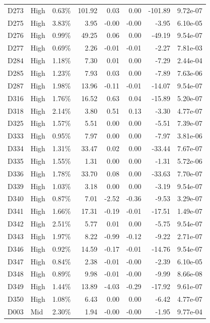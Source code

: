 \begin{tabular}{l l r r r r r r}
D273 & High & 0.63\% & 101.92 & 0.03 & 0.00 & -101.89 & 9.72e-07 \\
D275 & High & 3.83\% & 3.95 & -0.00 & -0.00 & -3.95 & 6.10e-05 \\
D276 & High & 0.99\% & 49.25 & 0.06 & 0.00 & -49.19 & 9.54e-07 \\
D277 & High & 0.69\% & 2.26 & -0.01 & -0.01 & -2.27 & 7.81e-03 \\
D284 & High & 1.18\% & 7.30 & 0.01 & 0.00 & -7.29 & 2.44e-04 \\
D285 & High & 1.23\% & 7.93 & 0.03 & 0.00 & -7.89 & 7.63e-06 \\
D287 & High & 1.98\% & 13.96 & -0.11 & -0.01 & -14.07 & 9.54e-07 \\
D316 & High & 1.76\% & 16.52 & 0.63 & 0.04 & -15.89 & 5.20e-07 \\
D318 & High & 2.14\% & 3.80 & 0.51 & 0.13 & -3.30 & 4.77e-07 \\
D325 & High & 1.57\% & 5.51 & 0.00 & 0.00 & -5.51 & 7.39e-07 \\
D333 & High & 0.95\% & 7.97 & 0.00 & 0.00 & -7.97 & 3.81e-06 \\
D334 & High & 1.31\% & 33.47 & 0.02 & 0.00 & -33.44 & 7.67e-07 \\
D335 & High & 1.55\% & 1.31 & 0.00 & 0.00 & -1.31 & 5.72e-06 \\
D336 & High & 1.78\% & 33.70 & 0.08 & 0.00 & -33.63 & 7.70e-07 \\
D339 & High & 1.03\% & 3.18 & 0.00 & 0.00 & -3.19 & 9.54e-07 \\
D340 & High & 0.87\% & 7.01 & -2.52 & -0.36 & -9.53 & 3.29e-07 \\
D341 & High & 1.66\% & 17.31 & -0.19 & -0.01 & -17.51 & 1.49e-07 \\
D342 & High & 2.51\% & 5.77 & 0.01 & 0.00 & -5.75 & 9.54e-07 \\
D343 & High & 1.97\% & 8.22 & -0.99 & -0.12 & -9.22 & 2.71e-07 \\
D346 & High & 0.92\% & 14.59 & -0.17 & -0.01 & -14.76 & 9.54e-07 \\
D347 & High & 0.84\% & 2.38 & -0.01 & -0.00 & -2.39 & 6.10e-05 \\
D348 & High & 0.89\% & 9.98 & -0.01 & -0.00 & -9.99 & 8.66e-08 \\
D349 & High & 1.44\% & 13.89 & -4.03 & -0.29 & -17.92 & 9.61e-07 \\
D350 & High & 1.08\% & 6.43 & 0.00 & 0.00 & -6.42 & 4.77e-07 \\
D003 & Mid & 2.30\% & 1.94 & -0.00 & -0.00 & -1.95 & 9.77e-04 \\

\end{tabular}
